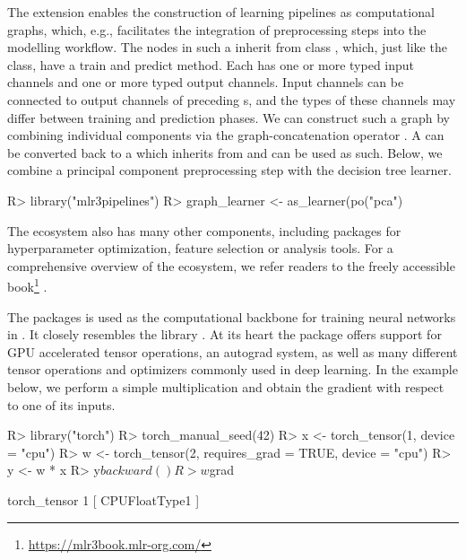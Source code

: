 \documentclass[article]{jss}
\theoremstyle{definition}
\begin{document}
The  extension enables the construction of learning pipelines as computational graphs, which, e.g., facilitates the integration of preprocessing steps into the modelling workflow.
The nodes in such a  inherit from class , which, just like the  class, have a train and predict method.
Each  has one or more typed input channels and one or more typed output channels. Input channels can be connected to output channels of preceding s, and the types of these channels may differ between training and prediction phases.
We can construct such a graph by combining individual components via the graph-concatenation operator \code{\%>>\%}.
A  can be converted back to a  which inherits from  and can be used as such.
Below, we combine a principal component preprocessing step with the decision tree learner.

\begin{CodeInput}
R> library("mlr3pipelines")
R> graph_learner <- as_learner(po("pca") %
\end{CodeInput}

The  ecosystem also has many other components, including packages for hyperparameter optimization, feature selection or analysis tools.
For a comprehensive overview of the  ecosystem, we refer readers to the freely accessible book\footnote{\url{https://mlr3book.mlr-org.com/}} \citep{ref-mlr3book}.

The  packages is used as the computational backbone for training neural networks in .
It closely resembles the \pytorch{} \python{} library \citep{ref-pytorch}.
At its heart the package offers support for GPU accelerated tensor operations, an autograd system, as well as many different tensor operations and optimizers commonly used in deep learning.
In the example below, we perform a simple multiplication and obtain the gradient with respect to one of its inputs.

\begin{CodeInput}
R> library("torch")
R> torch_manual_seed(42)
R> x <- torch_tensor(1, device = "cpu")
R> w <- torch_tensor(2, requires_grad = TRUE, device = "cpu")
R> y <- w * x
R> y$backward()
R> w$grad
\end{CodeInput}
\begin{CodeOutput}
torch_tensor
 1
[ CPUFloatType{1} ]
\end{CodeOutput}
\end{document}
